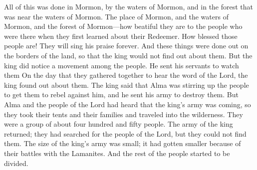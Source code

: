 All of this was done in Mormon, by the waters of Mormon, and in the forest that was near the waters of Mormon. The place of Mormon, and the waters of Mormon, and the forest of Mormon---how beatiful they are to the people who were there when they first learned about their Redeemer. How blessed those people are! They will sing his praise forever.
\bverse \iffalse And these things were done in the borders of the land, that they might not come to the knowledge of the king. \fi
And these things were done out on the borders of the land, so that the king would not find out about them.
\bverse \iffalse But behold, it came to pass that the king, having discovered a movement among the people, sent his servants to watch them.  Therefore on the day that they were assembling themselves together to hear the word of the Lord they were discovered unto the king. \fi
But the king did notice a movement among the people. He sent his servants to watch them On the day that they gathered together to hear the word of the Lord, the king found out about them.
\bverse \iffalse And now the king said that Alma was stirring up the people to rebellion against him; therefore he sent his army to destroy them. \fi
The king said that Alma was stirring up the people to get them to rebel against him, and he sent his army to destroy them.
\bverse \iffalse And it came to pass that Alma and the people of the Lord were apprised of the coming of the king's army; therefore they took their tents and their families and departed into the wilderness. \fi
But Alma and the people of the Lord had heard that the king's army was coming, so they took their tents and their families and traveled into the wilderness.
\bverse \iffalse And they were in number about four hundred and fifty souls. \fi
They were a group of about four hundred and fifty people.
\bchapter
\bverse \iffalse And it came to pass that the army of the king returned, having searched in vain for the people of the Lord. \fi
The army of the king returned; they had searched for the people of the Lord, but they could not find them.
\bverse \iffalse And now behold, the forces of the king were small, having been reduced, and there began to be a division among the remainder of the people. \fi
The size of the king's army was small; it had gotten smaller because of their battles with the Lamanites. And the rest of the people started to be divided.
\bverse \iffalse And the lesser part began to breathe out threatenings against the king, and there began to be a great contention among them. \fi
